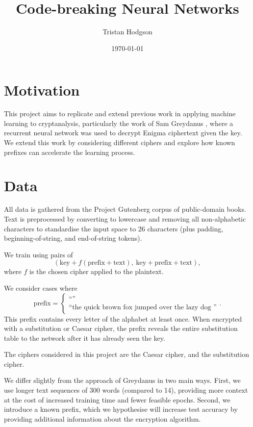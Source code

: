 \documentclass[a4paper,11pt]{article}
\title{Code-breaking Neural Networks}
\author{Tristan Hodgson}
\date{\today}
\begin{document}
\maketitle

\section{Motivation}

This project aims to replicate and extend previous work in applying machine learning to cryptanalysis, particularly the work of Sam Greydanus \cite{greydanus2017enigma}, where a recurrent neural network was used to decrypt Enigma ciphertext given the key. We extend this work by considering different ciphers and explore how known prefixes can accelerate the learning process.

\section{Data}

All data is gathered from the Project Gutenberg \cite{projectgutenberg} corpus of public-domain books. Text is preprocessed by converting to lowercase and removing all non-alphabetic characters to standardise the input space to 26 characters (plus padding, beginning-of-string, and end-of-string tokens).

We train using pairs of
\[
(\text{key} + f(\text{prefix} + \text{text}),\ \text{key} + \text{prefix} + \text{text}),
\]
where $f$ is the chosen cipher applied to the plaintext.

We consider cases where
\[
\text{prefix} =
\begin{cases}
\text{``''} \\
\text{``the quick brown fox jumped over the lazy dog ''}
\end{cases}.
\]
This prefix contains every letter of the alphabet at least once. When encrypted with a substitution or Caesar cipher, the prefix reveals the entire substitution table to the network after it has already seen the key.

The ciphers considered in this project are the Caesar cipher, and the substitution cipher.

We differ slightly from the approach of Greydanus in two main ways. First, we use longer text sequences of 300 words (compared to 14), providing more context at the cost of increased training time and fewer feasible epochs. Second, we introduce a known prefix, which we hypothesise will increase test accuracy by providing additional information about the encryption algorithm.
\end{document}
